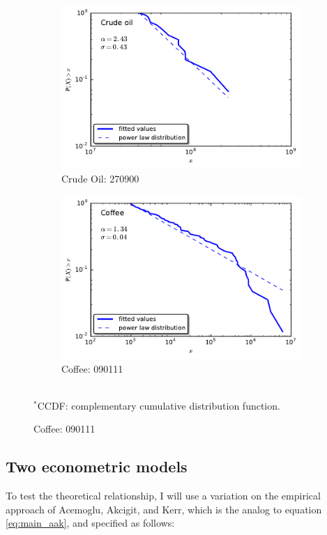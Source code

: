 \documentclass[10pt,letterpaper,pdftex]{article}
\begin{document}
\begin{figure}[!htb]\label{fig:CCDF}
  \caption{Sample fit to CCDF$^*$ for two products, 2014}
  \centering
  \begin{subfigure}[b]{0.65\textwidth}
  \includegraphics[width=\textwidth]{plots/oil_ccdf.pdf} 
  \caption{Crude Oil: 270900}
  \end{subfigure}
  \begin{subfigure}[b]{0.65\textwidth}
  \includegraphics[width=\textwidth]{plots/coffee_ccdf.pdf} 
  \caption{Coffee: 090111}
  \end{subfigure}  \\
\footnotesize{$^*$CCDF: complementary cumulative distribution function.}
\end{figure} 


\subsection{Two econometric models} \label{models-econometric}
To test the theoretical relationship, I will use a variation on the empirical approach of Acemoglu, Akcigit, and Kerr, which is the analog to equation \ref{eq:main_aak}, and specified as follows:
\end{document}
